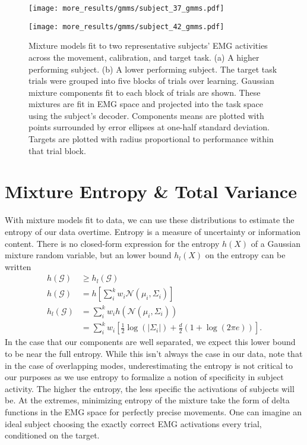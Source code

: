 \documentclass[../main.tex]{subfiles}
\begin{document}
\begin{sidewaysfigure}[!htb]
  \centering
  \begin{minipage}{0.49\linewidth}
    \centering
    \texttt{[image: more\_results/gmms/subject\_37\_gmms.pdf]}
    \subcaption{}
  \end{minipage}%
  \begin{minipage}{0.49\linewidth}
    \centering
    \texttt{[image: more\_results/gmms/subject\_42\_gmms.pdf]}
    \subcaption{}
  \end{minipage}
  \caption[Gaussian mixtures models showing component pairs]{Mixture models fit to two representative subjects' EMG activities across the movement, calibration, and target task. (a) A higher performing subject. (b) A lower performing subject. The target task trials were grouped into five blocks of trials over learning. Gaussian mixture components fit to each block of trials are shown. These mixtures are fit in EMG space and projected into the task space using the subject's decoder. Components means are plotted with points surrounded by error ellipses at one-half standard deviation. Targets are plotted with radius proportional to performance within that trial block.}\label{fig:example_trial_gmms}
\end{sidewaysfigure}









\section{Mixture Entropy \& Total Variance}

With mixture models fit to data, we can use these distributions to estimate the entropy of our data overtime. Entropy is a measure of uncertainty or information content. There is no closed-form expression for the entropy $h(X)$ of a Gaussian mixture random variable, but an lower bound $h_l(X)$ on the entropy can be written
%
\begin{align}
  h(\mathcal{G}) &\geq h_l(\mathcal{G}) \\ 
  h(\mathcal{G}) &= h\left[\sum_{i}^{k}{w_i\mathcal{N}(\mu_i,\Sigma_i)}\right]\\
  h_l(\mathcal{G}) &= \sum_i^k{w_i h(\mathcal{N}(\mu_i,\Sigma_i))} \\
  &= \sum_i^k{w_i \left[\frac{1}{2}\log{(|\Sigma_i|)} + \frac{d}{2}\left(1 + \log(2\pi e)\right)\right]}.
\end{align}
%
In the case that our components are well separated, we expect this lower bound to be near the full entropy. While this isn't always the case in our data, note that in the case of overlapping modes, underestimating the entropy is not critical to our purposes as we use entropy to formalize a notion of specificity in subject activity. The higher the entropy, the less specific the activations of subjects will be. At the extremes, minimizing entropy of the mixture take the form of delta functions in the EMG space for perfectly precise movements. One can imagine an ideal subject choosing the exactly correct EMG activations every trial, conditioned on the target. 
\end{document}
